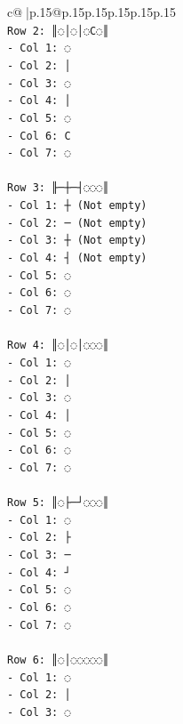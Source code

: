 \documentclass{article}
\begin{document}
{\begin{supertabular}{c@{$\;$}|p{.15\linewidth}@{}p{.15\linewidth}p{.15\linewidth}p{.15\linewidth}p{.15\linewidth}p{.15\linewidth}}
{{{\\ 
\texttt{Row 2: ║◌│◌│◌C◌║} \\
\texttt{{-} Col 1: ◌} \\
\texttt{{-} Col 2: │} \\
\texttt{{-} Col 3: ◌} \\
\texttt{{-} Col 4: │} \\
\texttt{{-} Col 5: ◌} \\
\texttt{{-} Col 6: C} \\
\texttt{{-} Col 7: ◌} \\
\\ 
\texttt{Row 3: ╟─┼─┤◌◌◌║} \\
\texttt{{-} Col 1: ┼ (Not empty)} \\
\texttt{{-} Col 2: ─ (Not empty)} \\
\texttt{{-} Col 3: ┼ (Not empty)} \\
\texttt{{-} Col 4: ┤ (Not empty)} \\
\texttt{{-} Col 5: ◌} \\
\texttt{{-} Col 6: ◌} \\
\texttt{{-} Col 7: ◌} \\
\\ 
\texttt{Row 4: ║◌│◌│◌◌◌║} \\
\texttt{{-} Col 1: ◌} \\
\texttt{{-} Col 2: │} \\
\texttt{{-} Col 3: ◌} \\
\texttt{{-} Col 4: │} \\
\texttt{{-} Col 5: ◌} \\
\texttt{{-} Col 6: ◌} \\
\texttt{{-} Col 7: ◌} \\
\\ 
\texttt{Row 5: ║◌├─┘◌◌◌║} \\
\texttt{{-} Col 1: ◌} \\
\texttt{{-} Col 2: ├} \\
\texttt{{-} Col 3: ─} \\
\texttt{{-} Col 4: ┘} \\
\texttt{{-} Col 5: ◌} \\
\texttt{{-} Col 6: ◌} \\
\texttt{{-} Col 7: ◌} \\
\\ 
\texttt{Row 6: ║◌│◌◌◌◌◌║} \\
\texttt{{-} Col 1: ◌} \\
\texttt{{-} Col 2: │} \\
\texttt{{-} Col 3: ◌} \\
}}}
\end{supertabular}}
\end{document}
